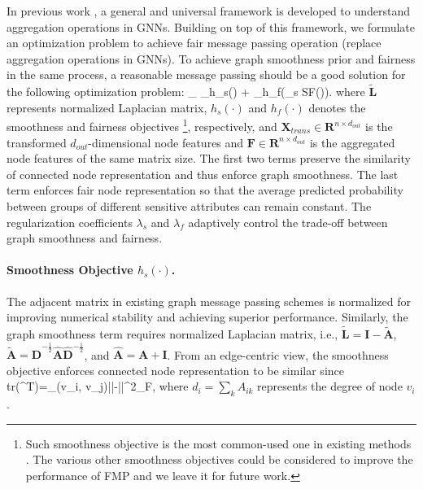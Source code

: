\documentclass[letterpaper]{article} %
\theoremstyle{plain}
\theoremstyle{definition}
\theoremstyle{remark}
\begin{document}
In previous work \citep{ma2021unified}, a general and universal framework is developed to understand aggregation operations in GNNs. Building on top of this framework, we formulate an optimization problem to achieve fair message passing operation (replace aggregation operations in GNNs).
To achieve graph smoothness prior and fairness in the same process, a reasonable message passing should be a good solution for the following optimization problem:
\be \label{eq:optimization}
\min\limits_{} _{h_s()} + _{h_f\big(\mathbf{\Delta}_s SF()\big)}.
\ee
where $\tilde{\mathbf{L}}$ represents normalized Laplacian matrix, $h_s(\cdot)$ and $h_f(\cdot)$ denotes the smoothness and fairness objectives \footnote{Such smoothness objective is the most common-used one in existing methods \citep{ma2021unified,belkin2001laplacian,kalofolias2016learn}.
The various other smoothness objectives could be considered to improve the performance of FMP and we leave it for future work.}, respectively, and
$\mathbf{X}_{trans}\in \mathbf{R}^{n \times d_{out}}$ is the transformed $d_{out}$-dimensional node features and $\mathbf{F}\in \mathbf{R}^{n \times d_{out}}$ is the aggregated node features of the same matrix size. The first two terms preserve the similarity of connected node representation and thus enforce graph smoothness. The last term enforces fair node representation so that the average predicted probability between groups of different sensitive attributes can remain constant. The regularization coefficients $\lambda_s$ and $\lambda_f$ adaptively control the trade-off between graph smoothness and fairness.

\paragraph{Smoothness Objective $h_s(\cdot)$.} The adjacent matrix in existing graph message passing schemes is normalized for improving numerical stability and achieving superior performance. Similarly, the graph smoothness term requires normalized Laplacian matrix, i.e., $\tilde{\mathbf{L}}=\mathbf{I}-\tilde{\mathbf{A}}$, $\tilde{\mathbf{A}}=\hat{\mathbf{D}}^{-\frac{1}{2}}\hat{\mathbf{A}}\hat{\mathbf{D}}^{-\frac{1}{2}}$, and $\hat{\mathbf{A}}=\mathbf{A}+\mathbf{I}$. From an edge-centric view, the smoothness objective enforces connected node representation to be similar since
\be
tr(^{T})=\sum_{(v_i, v_j)\in{}}||-||^2_F,
\ee
where $d_i=\sum_{k}A_{ik}$ represents the degree of node $v_i$.
\end{document}
